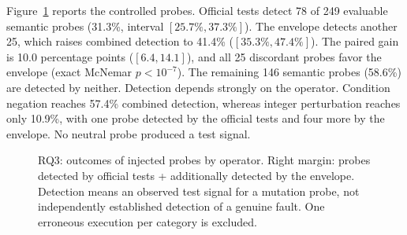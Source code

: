\documentclass[a4paper,fleqn]{cas-sc}
\newcommand{\code}[1]{\texttt{\detokenize{#1}}}
\begin{document}
Figure~\ref{fig:rq3} reports the controlled probes. Official tests detect 78 of 249 evaluable semantic probes (31.3\%, interval $[25.7\%, 37.3\%]$). The envelope detects another 25, which raises combined detection to 41.4\% ($[35.3\%, 47.4\%]$). The paired gain is 10.0 percentage points ($[6.4, 14.1]$), and all 25 discordant probes favor the envelope (exact McNemar $p<10^{-7}$). The remaining 146 semantic probes (58.6\%) are detected by neither. Detection depends strongly on the operator. Condition negation reaches 57.4\% combined detection, whereas integer perturbation reaches only 10.9\%, with one probe detected by the official tests and four more by the envelope. No neutral probe produced a test signal.

\begin{figure}[pos=htbp]
\centering
\caption{RQ3: outcomes of injected probes by operator. Right margin: probes detected by official tests + additionally detected by the envelope. Detection means an observed test signal for a mutation probe, not independently established detection of a genuine fault. One erroneous execution per category is excluded.}
\label{fig:rq3}
\end{figure}
\end{document}
